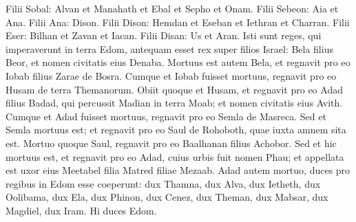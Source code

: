 \begin{biblechapter}
\verse Filii Sobal: Alvan et Manahath et Ebal et Sepho et Onam. Filii Sebeon: Aia et Ana. 
\verse Filii Ana: Dison. Filii Dison: Hemdan et Eseban et Iethran et Charran. 
\verse Filii Eser: Bilhan et Zavan et Iacan. Filii Disan: Us et Aran. 
\verse Isti sunt reges, qui imperaverunt in terra Edom, antequam esset rex super filios Israel: Bela filius Beor, et nomen civitatis eius Denaba. 
\verse Mortuus est autem Bela, et regnavit pro eo Iobab filius Zarae de Bosra. 
\verse Cumque et Iobab fuisset mortuus, regnavit pro eo Husam de terra Themanorum. 
\verse Obiit quoque et Husam, et regnavit pro eo Adad filius Badad, qui percussit Madian in terra Moab; et nomen civitatis eius Avith. 
\verse Cumque et Adad fuisset mortuus, regnavit pro eo Semla de Masreca. 
\verse Sed et Semla mortuus est; et regnavit pro eo Saul de Rohoboth, quae iuxta amnem sita est.
\verse Mortuo quoque Saul, regnavit pro eo Baalhanan filius Achobor. 
\verse Sed et hic mortuus est, et regnavit pro eo Adad, cuius urbis fuit nomen Phau; et appellata est uxor eius Meetabel filia Matred filiae Mezaab. 
\verse Adad autem mortuo, duces pro regibus in Edom esse coeperunt: dux Thamna, dux Alva, dux Ietheth, 
\verse dux Oolibama, dux Ela, dux Phinon, 
\verse dux Cenez, dux Theman, dux Mabsar, 
\verse dux Magdiel, dux Iram. Hi duces Edom. 
\end{biblechapter}

